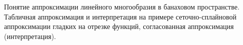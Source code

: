 \documentclass[__main__.tex]{subfiles}
\begin{document}
Понятие аппроксимации линейного многообразия в банаховом пространстве. Табличная аппроксимация и интерпретация на примере сеточно-сплайновой аппроксимации гладких на отрезке функций, согласованная аппроксимация (интерпретация).
\end{document}
